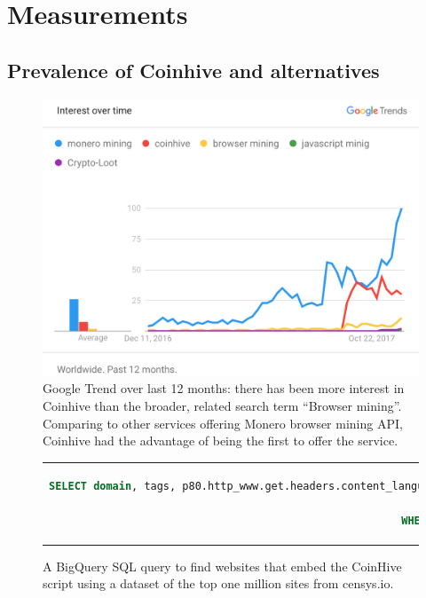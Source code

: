 %
%
%
%
%
%

\section{Measurements}

\subsection{Prevalence of Coinhive and alternatives}

\begin{figure}[t]
\centering
\includegraphics[width=0.9\linewidth]{figures/usage_over_time2.png}
\caption{Google Trend over last 12 months: there has been more interest in Coinhive than the broader, related search term ``Browser mining''. Comparing to other services offering Monero browser mining API, Coinhive had the advantage of being the first to offer the service. \label{fig:trend}}
\end{figure}

\begin{figure}[t]
\begin{tabular}{c}
\begin{lstlisting}[language=sql]
SELECT domain, tags, p80.http_www.get.headers.content_language, p80.http_www.get.headers.server, p80.http.get.headers.x_powered_by, p80.http.get.title, p80.http_www.get.body as wwwbody, p80.http.get.body as plainbody 
FROM censys-io.domain_public.20171123
WHERE STRPOS(p80.http.get.body, coinhive.min.js) > 0 or STRPOS(p80.http_www.get.body, coinhive.min.js) >0)
\end{lstlisting}
\end{tabular}
\caption{A BigQuery SQL query to find websites that embed the CoinHive script using a dataset of the top one million sites from censys.io. \label{lst:bigquery}}
\end{figure}

